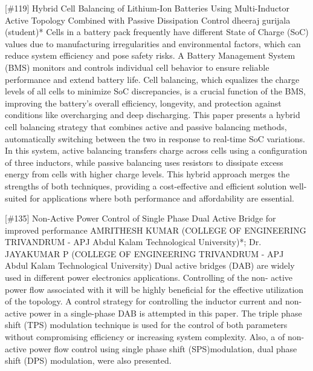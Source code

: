 {} \begin{abstract_online} {[\#119] Hybrid Cell Balancing of Lithium-Ion Batteries Using Multi-Inductor Active Topology Combined with Passive Dissipation Control} {} {dheeraj gurijala (student)*} {} Cells in a battery pack frequently have different State of Charge (SoC) values due to manufacturing irregularities and environmental factors, which can reduce system efficiency and pose safety risks. A Battery Management System (BMS) monitors and controls individual cell behavior to ensure reliable performance and extend battery life. Cell balancing, which equalizes the charge levels of all cells to minimize SoC discrepancies, is a crucial function of the BMS, improving the battery's overall efficiency, longevity, and protection against conditions like overcharging and deep discharging. This paper presents a hybrid cell balancing strategy that combines active and passive balancing methods, automatically switching between the two in response to real-time SoC variations. In this system, active balancing transfers charge across cells using a configuration of three inductors, while passive balancing uses resistors to dissipate excess energy from cells with higher charge levels. This hybrid approach merges the strengths of both techniques, providing a cost-effective and efficient solution well-suited for applications where both performance and affordability are essential. \end{abstract_online} 
{} \begin{abstract_online} {[\#135] Non-Active Power Control of Single Phase Dual Active Bridge for improved performance} {} {AMRITHESH KUMAR (COLLEGE OF ENGINEERING TRIVANDRUM - APJ Abdul Kalam Technological University)*; Dr. JAYAKUMAR P (COLLEGE OF ENGINEERING TRIVANDRUM - APJ Abdul Kalam Technological University)} {} Dual active bridges (DAB) are widely used in different power electronics applications. Controlling of the non- active power flow associated with it will be highly beneficial for the effective utilization of the topology. A control strategy for controlling the inductor current and non-active power in a single-phase DAB is attempted in this paper. The triple phase shift (TPS) modulation technique is used for the control of both parameters without compromising efficiency or increasing system complexity. Also, a of non-active power flow control using single phase shift (SPS)modulation, dual phase shift (DPS) modulation, were also presented. \end{abstract_online} 
